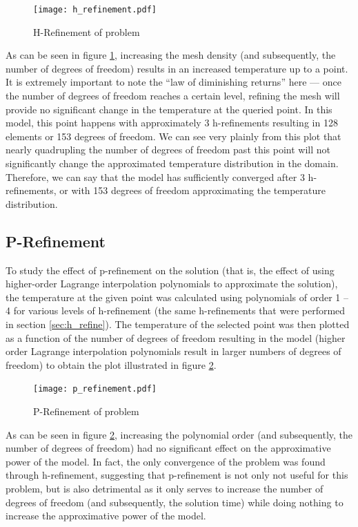 \documentclass[letterpaper,10pt]{article}
\begin{document}
\begin{figure}[H]
	\centering
	\texttt{[image: h\_refinement.pdf]}
	\caption{H-Refinement of problem}
	\label{fig:h_refinement}
\end{figure}

As can be seen in figure \ref{fig:h_refinement}, increasing the mesh density (and subsequently, the number of degrees of freedom) results in an increased temperature up to a point. It is extremely important to note the ``law of diminishing returns'' here --- once the number of degrees of freedom reaches a certain level, refining the mesh will provide no significant change in the temperature at the queried point. In this model, this point happens with approximately 3 h-refinements resulting in 128 elements or 153 degrees of freedom. We can see very plainly from this plot that nearly quadrupling the number of degrees of freedom past this point will not significantly change the approximated temperature distribution in the domain. Therefore, we can say that the model has sufficiently converged after 3 h-refinements, or with 153 degrees of freedom approximating the temperature distribution.

\subsection{P-Refinement}
To study the effect of p-refinement on the solution (that is, the effect of using higher-order Lagrange interpolation polynomials to approximate the solution), the temperature at the given point was calculated using polynomials of order 1 -- 4 for various levels of h-refinement (the same h-refinements that were performed in section \ref{sec:h_refine}). The temperature of the selected point was then plotted as a function of the number of degrees of freedom resulting in the model (higher order Lagrange interpolation polynomials result in larger numbers of degrees of freedom) to obtain the plot illustrated in figure \ref{fig:p_refinement}.

\begin{figure}[H]
	\centering
	\texttt{[image: p\_refinement.pdf]}
	\caption{P-Refinement of problem}
	\label{fig:p_refinement}
\end{figure}

As can be seen in figure \ref{fig:p_refinement}, increasing the polynomial order (and subsequently, the number of degrees of freedom) had no significant effect on the approximative power of the model. In fact, the only convergence of the problem was found through h-refinement, suggesting that p-refinement is not only not useful for this problem, but is also detrimental as it only serves to increase the number of degrees of freedom (and subsequently, the solution time) while doing nothing to increase the approximative power of the model.
\end{document}
